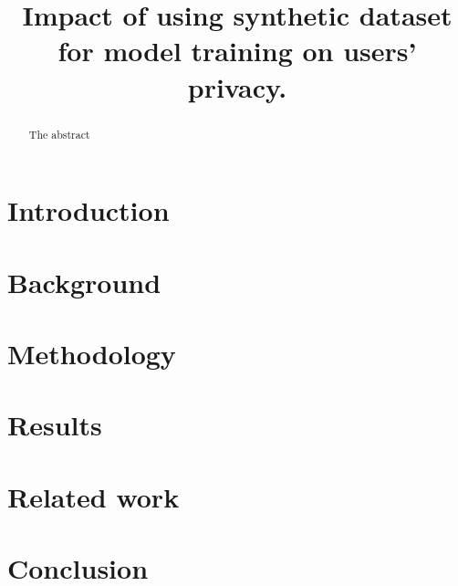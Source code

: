\documentclass{IEEEtran}
\title{Impact of using synthetic dataset for model training on users' privacy.}
\begin{document}
\maketitle

\begin{abstract}
    The abstract
\end{abstract}

\section{Introduction}


\section{Background}


\section{Methodology}


\section{Results}


\section{Related work}


\section{Conclusion}




\end{document}
